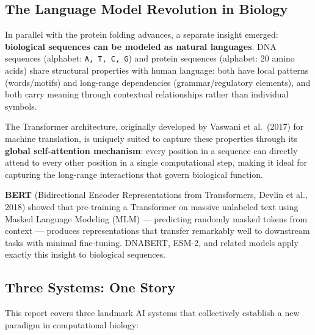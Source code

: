 ﻿\documentclass[12pt,a4paper]{article}
\begin{document}
\subsection{The Language Model Revolution in Biology}

In parallel with the protein folding advances, a separate insight emerged: \textbf{biological sequences can be modeled as natural languages}. DNA sequences (alphabet: \texttt{A, T, C, G}) and protein sequences (alphabet: 20 amino acids) share structural properties with human language: both have local patterns (words/motifs) and long-range dependencies (grammar/regulatory elements), and both carry meaning through contextual relationships rather than individual symbols.

The Transformer architecture, originally developed by Vaswani et al.\ (2017) for machine translation, is uniquely suited to capture these properties through its \textbf{global self-attention mechanism}: every position in a sequence can directly attend to every other position in a single computational step, making it ideal for capturing the long-range interactions that govern biological function.

\textbf{BERT} (Bidirectional Encoder Representations from Transformers, Devlin et al., 2018) showed that pre-training a Transformer on massive unlabeled text using Masked Language Modeling (MLM) --- predicting randomly masked tokens from context --- produces representations that transfer remarkably well to downstream tasks with minimal fine-tuning. DNABERT, ESM-2, and related models apply exactly this insight to biological sequences.

\subsection{Three Systems: One Story}

This report covers three landmark AI systems that collectively establish a new paradigm in computational biology:
\end{document}

